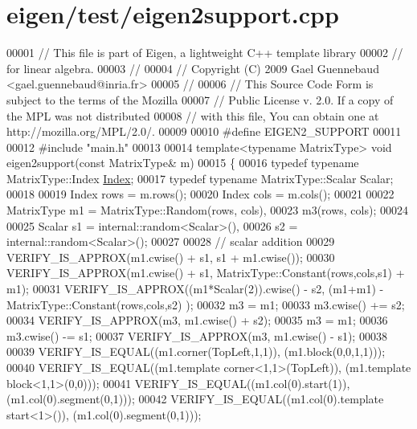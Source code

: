 \hypertarget{eigen_2test_2eigen2support_8cpp_source}{}\section{eigen/test/eigen2support.cpp}
\label{eigen_2test_2eigen2support_8cpp_source}

\begin{DoxyCode}
00001 \textcolor{comment}{// This file is part of Eigen, a lightweight C++ template library}
00002 \textcolor{comment}{// for linear algebra.}
00003 \textcolor{comment}{//}
00004 \textcolor{comment}{// Copyright (C) 2009 Gael Guennebaud <gael.guennebaud@inria.fr>}
00005 \textcolor{comment}{//}
00006 \textcolor{comment}{// This Source Code Form is subject to the terms of the Mozilla}
00007 \textcolor{comment}{// Public License v. 2.0. If a copy of the MPL was not distributed}
00008 \textcolor{comment}{// with this file, You can obtain one at http://mozilla.org/MPL/2.0/.}
00009 
00010 \textcolor{preprocessor}{#define EIGEN2\_SUPPORT}
00011 
00012 \textcolor{preprocessor}{#include "main.h"}
00013 
00014 \textcolor{keyword}{template}<\textcolor{keyword}{typename} MatrixType> \textcolor{keywordtype}{void} eigen2support(\textcolor{keyword}{const} MatrixType& m)
00015 \{
00016   \textcolor{keyword}{typedef} \textcolor{keyword}{typename} MatrixType::Index \hyperlink{namespace_eigen_a62e77e0933482dafde8fe197d9a2cfde}{Index};
00017   \textcolor{keyword}{typedef} \textcolor{keyword}{typename} MatrixType::Scalar Scalar;
00018 
00019   Index rows = m.rows();
00020   Index cols = m.cols();
00021 
00022   MatrixType m1 = MatrixType::Random(rows, cols),
00023              m3(rows, cols);
00024 
00025   Scalar  s1 = internal::random<Scalar>(),
00026           s2 = internal::random<Scalar>();
00027 
00028   \textcolor{comment}{// scalar addition}
00029   VERIFY\_IS\_APPROX(m1.cwise() + s1, s1 + m1.cwise());
00030   VERIFY\_IS\_APPROX(m1.cwise() + s1, MatrixType::Constant(rows,cols,s1) + m1);
00031   VERIFY\_IS\_APPROX((m1*Scalar(2)).cwise() - s2, (m1+m1) - MatrixType::Constant(rows,cols,s2) );
00032   m3 = m1;
00033   m3.cwise() += s2;
00034   VERIFY\_IS\_APPROX(m3, m1.cwise() + s2);
00035   m3 = m1;
00036   m3.cwise() -= s1;
00037   VERIFY\_IS\_APPROX(m3, m1.cwise() - s1);
00038 
00039   VERIFY\_IS\_EQUAL((m1.corner(TopLeft,1,1)), (m1.block(0,0,1,1)));
00040   VERIFY\_IS\_EQUAL((m1.template corner<1,1>(TopLeft)), (m1.template block<1,1>(0,0)));
00041   VERIFY\_IS\_EQUAL((m1.col(0).start(1)), (m1.col(0).segment(0,1)));
00042   VERIFY\_IS\_EQUAL((m1.col(0).template start<1>()), (m1.col(0).segment(0,1)));

\end{DoxyCode}
